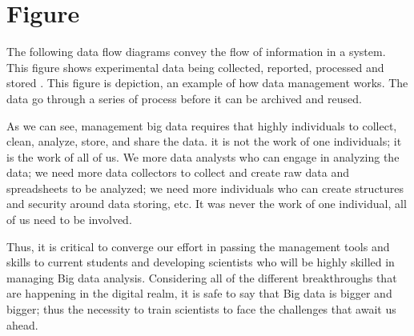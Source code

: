 \documentclass[sigconf]{acmart}
\begin{document}
\section{Figure}

The following data flow diagrams convey the flow of information in a system. This  figure shows experimental data being collected, reported, processed and stored \cite{fokkema2012}. This figure is depiction, an example of how data management works. The data go through a series of process before it can be archived and reused. 

As we can see, management big data requires that highly individuals to collect, clean, analyze, store, and share the data. it is not the work of one individuals; it is the work of all of us. We more data analysts who can engage in analyzing the data; we need more data collectors to collect and create raw data and spreadsheets to be analyzed; we need more individuals who can create structures and security around data storing, etc. It was never the work of one individual, all of us need to be involved. 

Thus, it is critical to converge our effort in passing the management tools and skills to current students and developing scientists who will be highly skilled in managing Big data analysis. Considering all of the different breakthroughs that are happening in the digital realm, it is safe to say that Big data is bigger and bigger; thus the necessity to train scientists to face the challenges that await us ahead.
\end{document}
